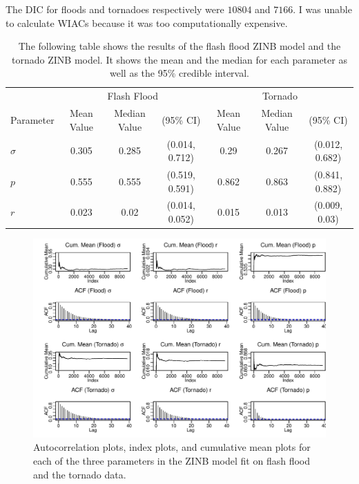 \documentclass{article}\usepackage[]{graphicx}\usepackage[]{color}
\makeatletter
\def\maxwidth{ %
  \ifdim\Gin@nat@width>\linewidth
    \linewidth
  \else
    \Gin@nat@width
  \fi
}
\newenvironment{knitrout}{}{} %
\makeatother
\begin{document}
The DIC for floods and tornadoes respectively were $10804$ and $7166$. I was unable to calculate WIACs because it was too computationally expensive.
\begin{table}
\centering
\caption{The following table shows the results of the flash flood ZINB model and the tornado ZINB model. It shows the mean and the median for each parameter as well as the 95\% credible interval.}
\label{t:ZINBparams}
\begin{tabular}{lcccccc}
\toprule
&\multicolumn{3}{c}{Flash Flood}&\multicolumn{3}{c}{Tornado}\\
\cmidrule(r){2-4}\cmidrule(l){5-7}
Parameter & Mean Value &Median Value & (95\% CI)& Mean Value &Median Value & (95\% CI)\\
\midrule
$\sigma$ & 0.305 &
  0.285&
  (0.014, 
    0.712)&
  0.29 &
  0.267&
  (0.012, 
    0.682)\\
$p$ &  0.555 &
  0.555&
  (0.519, 
    0.591)&
  0.862 &
  0.863&
  (0.841, 
    0.882)\\
$r$ &  0.023 &
  0.02&
  (0.014, 
    0.052)&
  0.015 &
  0.013&
  (0.009, 
    0.03)\\
\bottomrule
\end{tabular}
\end{table}
\begin{figure}
	\centering
\begin{knitrout}
\color{fgcolor}
\includegraphics[width=\maxwidth]{figure/floodconvergence-1} 

\end{knitrout}
	\caption{Autocorrelation plots, index plots, and cumulative mean plots for each of the three parameters in the ZINB model fit on flash flood and the tornado data.}
	\label{f:zinbconvergence}
\end{figure} 
\end{document}
